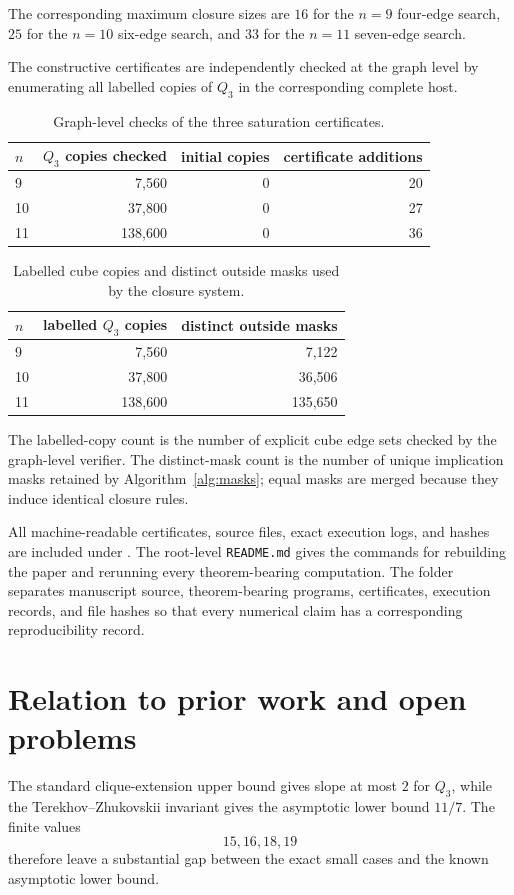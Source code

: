 \documentclass[11pt]{article}
\numberwithin{equation}{section}
\begin{document}
The corresponding maximum closure sizes are $16$ for the $n=9$ four-edge search, $25$ for the $n=10$ six-edge search, and $33$ for the $n=11$ seven-edge search.

The constructive certificates are independently checked at the graph level by enumerating all labelled copies of $Q_3$ in the corresponding complete host.
\begin{table}[t]
\centering
\caption{Graph-level checks of the three saturation certificates.}
\label{tab:graphcheck}
\begin{tabular}{lrrr}
\toprule
$n$ & $Q_3$ copies checked & initial copies & certificate additions \\
\midrule
9  & 7,560   & 0 & 20 \\
10 & 37,800  & 0 & 27 \\
11 & 138,600 & 0 & 36 \\
\bottomrule
\end{tabular}
\end{table}

\begin{table}[t]
\centering
\caption{Labelled cube copies and distinct outside masks used by the closure system.}
\label{tab:maskcounts}
\begin{tabular}{lrr}
\toprule
$n$ & labelled $Q_3$ copies & distinct outside masks \\
\midrule
9  & 7,560   & 7,122 \\
10 & 37,800  & 36,506 \\
11 & 138,600 & 135,650 \\
\bottomrule
\end{tabular}
\end{table}

The labelled-copy count is the number of explicit cube edge sets checked by
the graph-level verifier. The distinct-mask count is the number of unique
implication masks retained by Algorithm~\ref{alg:masks}; equal masks are
merged because they induce identical closure rules.

All machine-readable certificates, source files, exact execution logs, and hashes are included under . The root-level \texttt{README.md} gives the commands for rebuilding the paper and rerunning every theorem-bearing computation. The folder separates manuscript source, theorem-bearing programs, certificates, execution records, and file hashes so that every numerical claim has a corresponding reproducibility record.

\section{Relation to prior work and open problems}\label{sec:open}
The standard clique-extension upper bound gives slope at most $2$ for $Q_3$, while the Terekhov--Zhukovskii invariant gives the asymptotic lower bound $11/7$. The finite values
\[
15,16,18,19
\]
therefore leave a substantial gap between the exact small cases and the known asymptotic lower bound.
\end{document}
